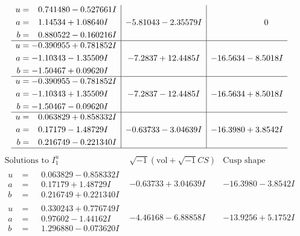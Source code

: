 \documentclass[1p]{elsarticle_modified}
\theoremstyle{definition}
\newcommand{\I}{\sqrt{-1}}
\begin{document}
$$\begin{array}{c|c|c}
\begin{aligned}
u &= \phantom{-}0.741480 - 0.527661 I \\
a &= \phantom{-}1.14534 + 1.08640 I \\
b &= \phantom{-}0.880522 - 0.160216 I\end{aligned}
 & -5.81043 - 2.35579 I & \phantom{-0.000000 } 0 \\ \hline\begin{aligned}
u &= -0.390955 + 0.781852 I \\
a &= -1.10343 - 1.35509 I \\
b &= -1.50467 + 0.09620 I\end{aligned}
 & -7.2837 + 12.4485 I & -16.5634 - 8.5018 I \\ \hline\begin{aligned}
u &= -0.390955 - 0.781852 I \\
a &= -1.10343 + 1.35509 I \\
b &= -1.50467 - 0.09620 I\end{aligned}
 & -7.2837 - 12.4485 I & -16.5634 + 8.5018 I \\ \hline\begin{aligned}
u &= \phantom{-}0.063829 + 0.858332 I \\
a &= \phantom{-}0.17179 - 1.48729 I \\
b &= \phantom{-}0.216749 - 0.221340 I\end{aligned}
 & -0.63733 - 3.04639 I & -16.3980 + 3.8542 I\\
 \hline 
 \end{array}$$\newpage$$\begin{array}{c|c|c}  
\text{Solutions to }I^u_{1}& \I (\text{vol} + \sqrt{-1}CS) & \text{Cusp shape}\\
 \hline 
\begin{aligned}
u &= \phantom{-}0.063829 - 0.858332 I \\
a &= \phantom{-}0.17179 + 1.48729 I \\
b &= \phantom{-}0.216749 + 0.221340 I\end{aligned}
 & -0.63733 + 3.04639 I & -16.3980 - 3.8542 I \\ \hline\begin{aligned}
u &= \phantom{-}0.330243 + 0.776749 I \\
a &= \phantom{-}0.97602 - 1.44162 I \\
b &= \phantom{-}1.296880 - 0.073620 I\end{aligned}
 & -4.46168 - 6.88858 I & -13.9256 + 5.1752 I \\ \hline\begin{aligned}

\end{aligned}
\end{array}$$
\end{document}
